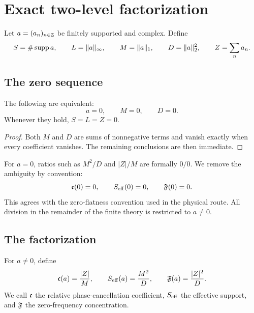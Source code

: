 \section{Exact two-level factorization}
\label{sec:finite-factorization}

Let \(a=(a_n)_{n\in\mathbb Z}\) be finitely supported and complex.  Define
\begin{equation}
 S=\#\operatorname{supp} a,\qquad
 L=\|a\|_\infty,\qquad
 M=\|a\|_1,\qquad
 D=\|a\|_2^2,\qquad
 Z=\sum_na_n.
\label{eq:SLMDZ}
\end{equation}

\subsection{The zero sequence}

\begin{lemma}
\label{lem:zero-edge}
The following are equivalent:
\[
 a=0,\qquad M=0,\qquad D=0.
\]
Whenever they hold, \(S=L=Z=0\).
\end{lemma}

\begin{proof}
Both \(M\) and \(D\) are sums of nonnegative terms and vanish exactly
when every coefficient vanishes.  The remaining conclusions are
then immediate.
\end{proof}

For \(a=0\), ratios such as \(M^2/D\) and \(|Z|/M\) are formally
\(0/0\).  We remove the ambiguity by convention:
\begin{equation}
 \mathfrak c(0)=0,\qquad
 S_{\mathrm{eff}}(0)=0,\qquad
 \mathfrak F(0)=0.
\label{eq:zero-convention}
\end{equation}
This agrees with the zero-flatness convention used in the physical
route.  All division in the remainder of the finite theory is
restricted to \(a\ne0\).

\subsection{The factorization}

\begin{definition}
\label{def:two-level-statistics}
For \(a\ne0\), define
\begin{equation}
 \mathfrak c(a)=\frac{|Z|}{M},\qquad
 S_{\mathrm{eff}}(a)=\frac{M^2}{D},\qquad
 \mathfrak F(a)=\frac{|Z|^2}{D}.
\label{eq:two-level-statistics}
\end{equation}
We call \(\mathfrak c\) the relative phase-cancellation coefficient,
\(S_{\mathrm{eff}}\) the effective support, and \(\mathfrak F\) the zero-frequency
concentration.
\end{definition}

